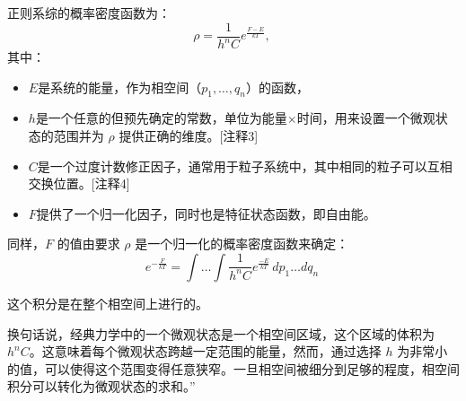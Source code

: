 正则系综的概率密度函数为：
\[
\rho = \frac{1}{h^n C} e^{\frac{F - E}{kT}},~
\]
其中：
\begin{itemize}
\item \( E \)是系统的能量，作为相空间（\( p_1, \dots, q_n \)）的函数，
\item \( h \)是一个任意的但预先确定的常数，单位为能量×时间，用来设置一个微观状态的范围并为 \( \rho \) 提供正确的维度。[注释3]
\item \( C \)是一个过度计数修正因子，通常用于粒子系统中，其中相同的粒子可以互相交换位置。[注释4]
\item \( F \)提供了一个归一化因子，同时也是特征状态函数，即自由能。
\end{itemize}
同样，\( F \) 的值由要求 \( \rho \) 是一个归一化的概率密度函数来确定：
\[
e^{- \frac{F}{kT}} = \int \ldots \int \frac{1}{h^n C} e^{\frac{-E}{kT}} \, dp_1 \ldots dq_n~
\]

这个积分是在整个相空间上进行的。

换句话说，经典力学中的一个微观状态是一个相空间区域，这个区域的体积为 \( h^n C \)。这意味着每个微观状态跨越一定范围的能量，然而，通过选择 \( h \) 为非常小的值，可以使得这个范围变得任意狭窄。一旦相空间被细分到足够的程度，相空间积分可以转化为微观状态的求和。”